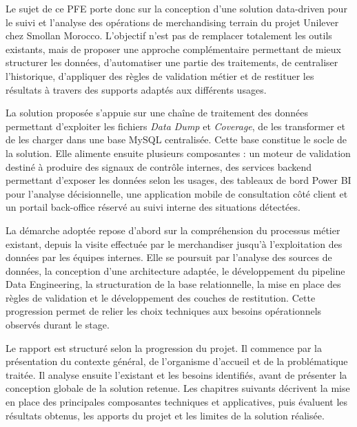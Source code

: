 Le sujet de ce PFE porte donc sur la conception d’une solution data-driven pour le suivi et l’analyse des opérations de merchandising terrain du projet Unilever chez Smollan Morocco. L’objectif n’est pas de remplacer totalement les outils existants, mais de proposer une approche complémentaire permettant de mieux structurer les données, d’automatiser une partie des traitements, de centraliser l’historique, d’appliquer des règles de validation métier et de restituer les résultats à travers des supports adaptés aux différents usages.

La solution proposée s’appuie sur une chaîne de traitement des données permettant d’exploiter les fichiers \textit{Data Dump} et \textit{Coverage}, de les transformer et de les charger dans une base MySQL centralisée. Cette base constitue le socle de la solution. Elle alimente ensuite plusieurs composantes : un moteur de validation destiné à produire des signaux de contrôle internes, des services backend permettant d’exposer les données selon les usages, des tableaux de bord Power BI pour l’analyse décisionnelle, une application mobile de consultation côté client et un portail back-office réservé au suivi interne des situations détectées.

La démarche adoptée repose d’abord sur la compréhension du processus métier existant, depuis la visite effectuée par le merchandiser jusqu’à l’exploitation des données par les équipes internes. Elle se poursuit par l’analyse des sources de données, la conception d’une architecture adaptée, le développement du pipeline Data Engineering, la structuration de la base relationnelle, la mise en place des règles de validation et le développement des couches de restitution. Cette progression permet de relier les choix techniques aux besoins opérationnels observés durant le stage.

Le rapport est structuré selon la progression du projet. Il commence par la présentation du contexte général, de l’organisme d’accueil et de la problématique traitée. Il analyse ensuite l’existant et les besoins identifiés, avant de présenter la conception globale de la solution retenue. Les chapitres suivants décrivent la mise en place des principales composantes techniques et applicatives, puis évaluent les résultats obtenus, les apports du projet et les limites de la solution réalisée.